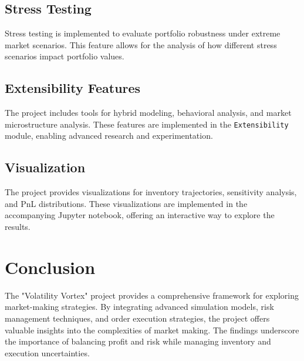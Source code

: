 \documentclass[12pt]{article}
\begin{document}
\subsection{Stress Testing}
Stress testing is implemented to evaluate portfolio robustness under extreme market scenarios. This feature allows for the analysis of how different stress scenarios impact portfolio values.

\subsection{Extensibility Features}
The project includes tools for hybrid modeling, behavioral analysis, and market microstructure analysis. These features are implemented in the \texttt{Extensibility} module, enabling advanced research and experimentation.

\subsection{Visualization}
The project provides visualizations for inventory trajectories, sensitivity analysis, and PnL distributions. These visualizations are implemented in the accompanying Jupyter notebook, offering an interactive way to explore the results.

\section{Conclusion}
The "Volatility Vortex" project provides a comprehensive framework for exploring market-making strategies. By integrating advanced simulation models, risk management techniques, and order execution strategies, the project offers valuable insights into the complexities of market making. The findings underscore the importance of balancing profit and risk while managing inventory and execution uncertainties.
\end{document}

